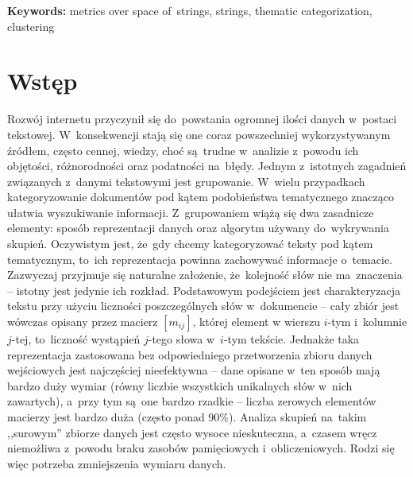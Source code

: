 \documentclass{praca1}
\begin{document}
\textbf{Keywords:} metrics over space of~strings, strings, thematic categorization, clustering


  \tableofcontents

\chapter{Wstęp}



Rozwój internetu przyczynił się do~powstania ogromnej ilości danych w~postaci tekstowej. W~konsekwencji stają się one coraz powszechniej wykorzystywanym źródłem, często cennej, wiedzy, choć są~trudne w~analizie z~powodu ich objętości, różnorodności oraz podatności na~błędy. %
Jednym z~istotnych zagadnień związanych z~danymi tekstowymi jest grupowanie. W~wielu przypadkach kategoryzowanie dokumentów pod kątem podobieństwa tematycznego znacząco ułatwia wyszukiwanie informacji. Z~grupowaniem wiążą się dwa zasadnicze elementy: sposób reprezentacji danych oraz algorytm używany do~wykrywania skupień. Oczywistym jest, że~gdy chcemy kategoryzować teksty pod kątem tematycznym, to~ich reprezentacja powinna zachowywać informacje o~temacie. Zazwyczaj przyjmuje się naturalne założenie, że~kolejność słów nie ma~znaczenia -- istotny jest jedynie ich rozkład. Podstawowym podejściem jest charakteryzacja tekstu przy użyciu liczności poszczególnych słów w~dokumencie -- cały zbiór jest wówczas opisany przez macierz $[m_{ij}]$, której element w wierszu $i$-tym i~kolumnie $j$-tej, to~liczność wystąpień \hbox{$j$-tego} słowa w~$i$-tym tekście. Jednakże taka reprezentacja zastosowana bez odpowiedniego przetworzenia zbioru danych wejściowych jest najczęściej nieefektywna -- dane opisane w~ten sposób mają bardzo duży wymiar (równy liczbie wszystkich unikalnych słów w~nich zawartych), a~przy tym są~one bardzo rzadkie -- liczba zerowych elementów macierzy jest bardzo duża (często ponad 90\%). Analiza skupień na~takim ,,surowym'' zbiorze danych jest często wysoce nieskuteczna, a~czasem wręcz niemożliwa z~powodu braku zasobów pamięciowych i~obliczeniowych. Rodzi się więc potrzeba zmniejszenia wymiaru danych.
\end{document}

